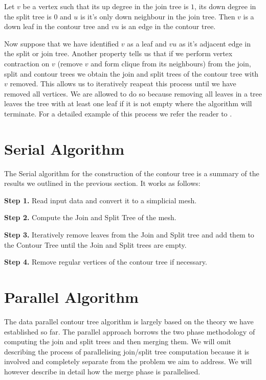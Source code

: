 \begin{defn} Let $v$ be a vertex such that its up degree in the join tree is $1$, its down degree in the split tree is $0$ and $u$ is it's only down neighbour in the join tree. Then $v$ is a down leaf in the contour tree and $vu$ is an edge in the contour tree.  \end{defn}


Now suppose that we have identified $v$ as a leaf and $vu$ as it's adjacent edge in the split or join tree. Another property \cite{carr-masters} tells us that if we perform vertex contraction on $v$ (remove $v$ and form clique from its neighbours) from the join, split and contour trees we obtain the join and split trees of the contour tree with $v$ removed. This allows us to iteratively reapeat this process until we have removed all vertices. We are allowed to do so because removing all leaves in a tree leaves the tree with at least one leaf if it is not empty where the algorithm will terminate. For a detailed example of this process we refer the reader to \cite{ct-big-paper}.

\section{Serial Algorithm}

The Serial algorithm for the construction of the contour tree is a summary of the results we outlined in the previous section. It works as follows:

\textbf{Step 1.} Read input data and convert it to a simplicial mesh.

\textbf{Step 2.} Compute the Join and Split Tree of the mesh.

\textbf{Step 3.} Iteratively remove leaves from the Join and Split tree and add them to the Contour Tree until the Join and Split trees are empty.

\textbf{Step 4.} Remove regular vertices of the contour tree if necessary.

\section{Parallel Algorithm}

The data parallel contour tree algorithm \cite{parallel-peak-pruning} is largely based on the theory we have established so far. The parallel approach borrows the two phase methodology of computing the join and split trees and then merging them. We will omit describing the process of parallelising join/split tree computation because it is involved and completely separate from the problem we aim to address. We will however describe in detail how the merge phase is parallelised.

